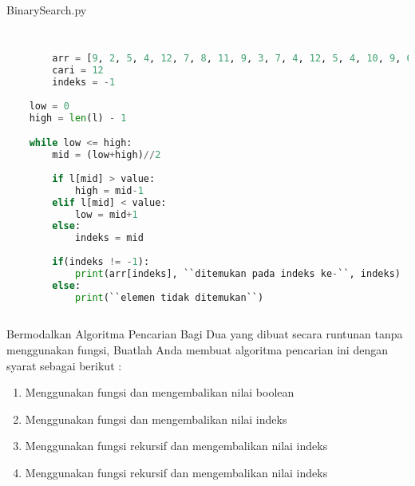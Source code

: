 \begin{listprog}{BinarySearch.py}
	\label{lst:binSearch}
	\begin{lstlisting}[language=Python]
	
	
		arr = [9, 2, 5, 4, 12, 7, 8, 11, 9, 3, 7, 4, 12, 5, 4, 10, 9, 6, 9, 4]
		cari = 12
		indeks = -1
		
    low = 0
    high = len(l) - 1

    while low <= high: 
        mid = (low+high)//2
        
        if l[mid] > value:
            high = mid-1
        elif l[mid] < value:
            low = mid+1
        else:
            indeks = mid
			
		if(indeks != -1):
			print(arr[indeks], ``ditemukan pada indeks ke-``, indeks)
		else:
			print(``elemen tidak ditemukan``)
			
	\end{lstlisting}
\end{listprog}

Bermodalkan Algoritma Pencarian Bagi Dua yang dibuat secara runtunan tanpa menggunakan fungsi, Buatlah Anda membuat algoritma pencarian ini dengan syarat sebagai berikut : 
\begin{enumerate}
\item{Menggunakan fungsi dan mengembalikan nilai boolean}
\item{Menggunakan fungsi dan mengembalikan nilai indeks}
\item{Menggunakan fungsi rekursif dan mengembalikan nilai indeks}
\item{Menggunakan fungsi rekursif dan mengembalikan nilai indeks}
\end{enumerate}




